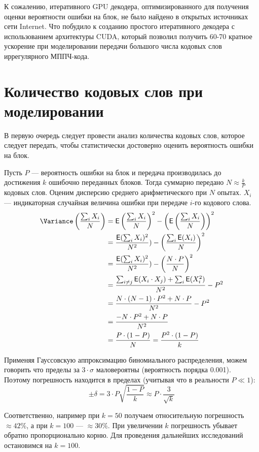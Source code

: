 К сожалению, итеративного GPU декодера, оптимизированного для получения оценки вероятности ошибки на блок,
не было найдено в открытых источниках сети Internet. Что побудило к созданию простого итеративного декодера
с использованием архитектуры CUDA, который позволил получить 60-70 кратное ускорение при моделировании
передачи большого числа кодовых слов иррегулярного МППЧ-кода.

\section{Количество кодовых слов при моделировании}

В первую очередь следует провести анализ количества кодовых слов, которое следует передать, чтобы 
статистически достоверно оценить вероятность ошибки на блок.

Пусть $P$ --- вероятность ошибки на блок и передача производилась до достижения $k$ ошибочно переданных блоков.
Тогда суммарно передано $N\approx \frac{k}{P}$ кодовых слов. Оценим дисперсию среднего арифметического при 
$N$ опытах. $X_i$ --- индикаторная случайная величина ошибки при передаче $i$-го кодового слова. 
\newcommand{\Expect}{\mathsf{E}}
\[
	\begin{split}
	\Variance \left({\frac{\sum_i{X_i}}{N}}\right) & =
	\Expect \left(\frac{\sum_i{X_i}}{N}\right)^2-\left(\Expect \left(\frac{\sum_i{X_i}}{N}\right)\right)^2 \\
	& = \frac{\Expect(\sum_i{X_i})^2}{N^2})-\left(\frac{\sum_i{\Expect(X_i)}}{N}\right)^2 \\
	& = \frac{\Expect(\sum_i{X_i})^2}{N^2})-\left(\frac{N \cdot P}{N}\right)^2 \\
	& = \frac{\sum_{i \neq j}{\Expect(X_i \cdot X_j)} + \sum_i{\Expect(X_i^2)}}{N^2}-P^2 \\
	& = \frac{N \cdot (N - 1) \cdot P^2 + N \cdot P}{N^2}-P^2 \\
	& = \frac{-N \cdot P^2 + N \cdot P}{N^2} \\
	& = \frac{P \cdot (1 - P)}{N}  = \frac{P^2 \cdot (1 - P)}{k}
	\end{split}
\]

Применяя Гауссовскую аппроксимацию биномиального распределения, можем говорить что пределы за $3\cdot \sigma$
маловероятны (вероятность порядка 0.001). Поэтому погрешность находится в пределах (учитывая что в реальности
$P \ll 1$):
\[
\pm \delta = 3 \cdot P \sqrt{\frac{1 - P}{k}} \approx P \cdot \frac{3}{\sqrt{k}} 
\]	 

Соответственно, например при $k=50$ получаем относительную погрешность $\approx 42\%$, 
а при $k=100$ --- $\approx 30\%$. При увеличении $k$ погрешность убывает обратно пропорционально корню.
Для проведения дальнейших исследований остановимся на $k=100$.

